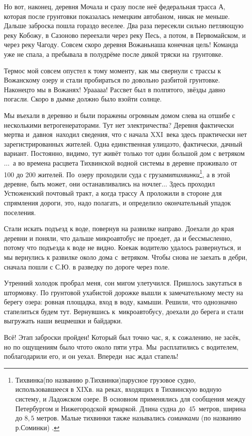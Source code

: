 Но вот, наконец, деревня Мочала и сразу после неё федеральная трасса А, которая после грунтовки показалась немецким автобаном, никак не меньше. Дальше заброска пошла гораздо веселее. Два раза пересекли сильно петляющую реку Кобожу, в Сазоново переехали через реку Песь, а потом, в Первомайском, и через реку Чагоду. Совсем скоро деревня Вожань\mdash наша конечная цель! Команда уже не спала, а пребывала в полудрёме после дикой тряски на~грунтовке.

Термос мой совсем опустел к тому моменту, как мы свернули с трассы к Вожанскому озеру и стали пробираться по довольно разбитой грунтовке. Наконец\sdash то мы в Вожанях! Ура\sdash а\sdash а\sdash а\sdash а! Рассвет был в полпятого, звёзды давно погасли. Скоро в дымке должно было взойти солнце. 

\renewcommand*{\thefootnote}{\fnsymbol{footnote}}
Мы въехали в деревню и были поражены огромным домом слева на отшибе с несколькими ветрогенераторами. Тут нет электричества? Деревня фактически мертва и~давно\mdash я~находил сведения, что с начала XXI~века здесь практически нет зарегистрированных жителей. Одна единственная улица\mdash это, фактически, дачный вариант. Постоянно, видимо, тут живёт только тот один большой дом с ветряком$\ldots$~а во времена расцвета Тихвинской водной системы в деревне проживало от 100 до 200 жителей. По~озеру проходили суда с грузами\mdash \textit{тихвинки}\footnote[1]{Тихвинка\thinspace(по названию р.\thinspace Тихвинки)\mdash парусное грузовое судно, использовавшееся в XIX\thinspace в. на реках, входящих в Тихвинскую водную систему, и Ладожском озере. В основном применялись для сообщения между Петербургом и Нижегородской ярмаркой. Длина судна до~45~метров, ширина до $8,5$ метров. Малые тихвинки также назывались \textit{соминками} (по названию р.\thinspace Соминки) \cite{МорскойСправочник}.}, а в этой деревне, быть может, они останавливались на ночлег$\ldots$ Здесь проходил Устюженский почтовый тракт, а когда трассу А проложили в стороне для спрямления дороги, это, надо полагать, и определило окончательный упадок поселения.

Стали искать подъезд к воде, повернув на развилке направо. Доехали до края деревни и поняли, что дальше микроавтобус не проедет, да и бессмысленно, потому что подъезда к воде не видно. Кое\sdash как водителю удалось развернуться, и мы вернулись к развилке около дома с~ветряком. Чтобы снова не заехать в дебри, сначала пошли с С.Ю. в разведку по дороге через поле. 

Утренний холодок пробрал меня, сон мигом улетучился. Пришлось закутаться в штормовку. По грунтовой ухабистой дорожке вышли к замечательному месту на берегу озера: ровная площадка, вход в воду, камыши. Решили, что однозначно стапелиться будем тут. Вернувшись к~микроавтобусу, доехали до берега и стали выгружать наши вещмешки и байдарки. 

Всё! Этап заброски пройден! Который был точно час, я, к сожалению, не засёк, но по ощущениям было что\sdash то около пяти утра. Мы~расплатились с водителем, поблагодарили его, и он уехал. Впереди~нас ждал стапель!

\begin{center}
\end{center}
